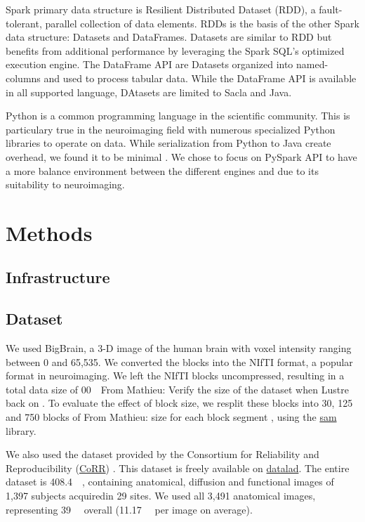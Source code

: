 \documentclass[conference]{IEEEtran}
\newcommand{\MD}[1]{\color{magenta}From Mathieu: #1 \color{black}}
\begin{document}
Spark primary data structure is Resilient Distributed Dataset (RDD)\cite{RDD}, a fault-tolerant, parallel collection of data elements.
RDDs is the basis of the other Spark data structure: Datasets and DataFrames.
Datasets are similar to RDD but benefits from additional performance by leveraging the Spark SQL's optimized execution engine.
The DataFrame API are Datasets organized into named-columns and used to process tabular data.
While the DataFrame API is available in all supported language, DAtasets are limited to Sacla and Java.

Python is a common programming language in the scientific community.
This is particulary true in the neuroimaging field with numerous specialized Python libraries to operate on data.
While serialization from Python to Java create overhead, we found it to be minimal \cite{8943502}.
We chose to focus on PySpark API to have a more balance environment between the different engines and due to its suitability to neuroimaging.

\section{Methods}
\subsection{Infrastructure} %


\subsection{Dataset}
We used BigBrain\cite{Amunts:13}, a 3-D image of the human brain with voxel intensity ranging between 0 and 65,535.
We converted the blocks into the NIfTI format, a popular format in neuroimaging.
We left the NIfTI blocks uncompressed, resulting in a total data size of \SI{00}{\giga\byte}\MD{Verify the size of the dataset when Lustre back on}.
To evaluate the effect of block size, we resplit these blocks into 30, 125 and 750 blocks of \MD{size for each block segment}, using the \href{https://github.com/big-data-lab-team/sam}{sam} library.
	
We also used the dataset provided by the Consortium for Reliability and Reproducibility (\href{http://fcon_1000.projects.nitrc.org/indi/CoRR/html/}{CoRR}) \cite{zuo2014open}.
This dataset is freely available on \href{https://datasets.datalad.org/?dir=/corr/RawDataBIDS}{datalad}.
The entire dataset is \SI{408.4}{\giga\byte}, containing anatomical, diffusion and functional images of 1,397 subjects acquiredin 29 sites.
We used all 3,491 anatomical images, representing \SI{39}{\giga\byte} overall (\SI{11.17}{\mega\byte} per image on average).
	
\end{document}
